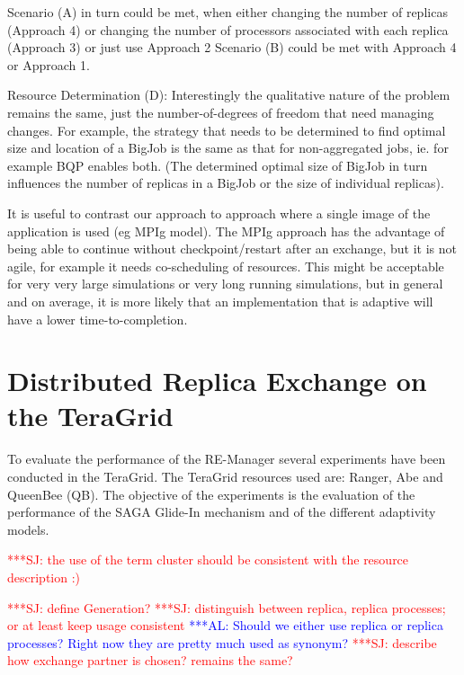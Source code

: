 \documentclass{rspublic}
\newcommand{\alnote}[1]{ {\textcolor{blue} { ***AL: #1 }}}
\newcommand{\jhanote}[1]{ {\textcolor{red} { ***SJ: #1 }}}
\newcommand{\alnote}[1]{}
\newcommand{\jhanote}[1]{}
\begin{document}
{Scenario (A) in turn could be met, when either changing the number of
replicas (Approach 4) or changing the number of processors associated
with each replica (Approach 3) or just use Approach 2 Scenario (B)
could be met with Approach 4 or Approach 1.

Resource Determination (D): Interestingly the qualitative nature of
the problem remains the same, just the number-of-degrees of freedom
that need managing changes. For example, the strategy that needs to be
determined to find optimal size and location of a BigJob is the same
as that for non-aggregated jobs, ie. for example BQP enables both.
(The determined optimal size of BigJob in turn influences the number
of replicas in a BigJob or the size of individual replicas).

It is useful to contrast our approach to approach where a single image
of the application is used (eg MPIg model). The MPIg approach has the
advantage of being able to continue without checkpoint/restart after
an exchange, but it is not agile, for example it needs co-scheduling
of resources. This might be acceptable for very very large simulations
or very long running simulations, but in general and on average, it
is more likely that an implementation that is adaptive will have a
lower time-to-completion.

\section{Distributed Replica Exchange on the TeraGrid}
\label{sec:exp}
        
To evaluate the performance of the RE-Manager several experiments have
been conducted in the TeraGrid. The TeraGrid resources used are: 
Ranger, Abe and QueenBee (QB). 
The objective of the experiments is the evaluation of the performance 
of the SAGA Glide-In mechanism and of the different adaptivity models.

\jhanote{the use of the term cluster should be consistent with the
  resource description :)}




\jhanote{define Generation?}
\jhanote{distinguish  between replica, replica processes; or at least
 keep usage consistent}       
\alnote{Should we either use replica or replica processes? Right now they
are pretty much used as synonym?}
\jhanote{describe how exchange partner is chosen? remains the same?}

}
\end{document}
